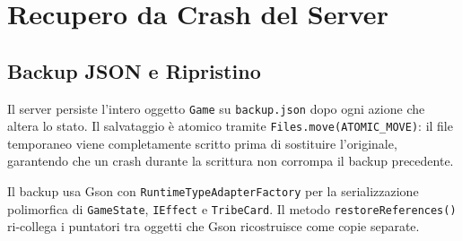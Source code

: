 \documentclass[a4paper,12pt]{article}
\newcommand{\code}[1]{\texttt{#1}}
\begin{document}
\newpage
\section{Recupero da Crash del Server}

\subsection{Backup JSON e Ripristino}

Il server persiste l'intero oggetto \code{Game} su \code{backup.json} dopo
ogni azione che altera lo stato. Il salvataggio è atomico tramite
\code{Files.move(ATOMIC\_MOVE)}: il file temporaneo viene completamente scritto
prima di sostituire l'originale, garantendo che un crash durante la scrittura
non corrompa il backup precedente.

Il backup usa Gson con \code{RuntimeTypeAdapterFactory} per la serializzazione
polimorfica di \code{GameState}, \code{IEffect} e \code{TribeCard}.
Il metodo \code{restoreReferences()} ri-collega i puntatori tra oggetti
che Gson ricostruisce come copie separate.
\end{document}
